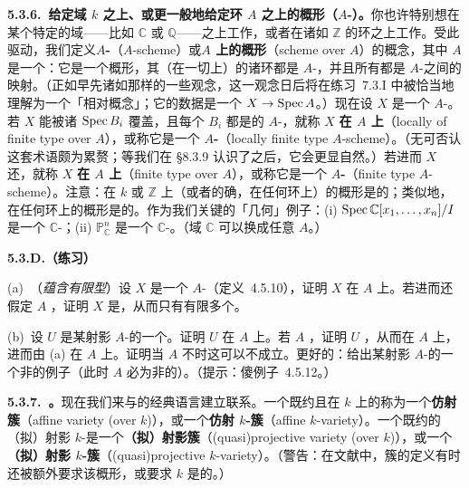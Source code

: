 \textbf{5.3.6.\ 给定域 $k$ 之上、或更一般地给定环 $A$ 之上的概形（$A$-\trScheme）。}\quad 你也许特别想在某个特定的域——比如 $\mathbb{C}$ 或 $\mathbb{Q}$——之上工作，或者在诸如 $\mathbb{Z}$ 的环之上工作。受此驱动，我们定义\textbf{$A$-\trScheme}（$A$-scheme）或\textbf{$A$ 上的概形}（scheme over $A$）的概念，其中 $A$ 是一个\trRing：它是一个概形，其\trStructureSheaf{}（在一切\trOpenSet{}上）的诸\trSection{}环都是 $A$-\trAlgebra，并且所有\trRestrictionMap{}都是 $A$-\trAlgebra{}之间的映射。（正如早先诸如\trQuasiseparatedness{}那样的一些观念，这一观念日后将在练习~7.3.I 中被恰当地理解为一个「相对概念」；它的数据是一个\trMorphism{} $X\to\operatorname{Spec} A$。）现在设 $X$ 是一个 $A$-\trScheme。若 $X$ 能被诸\trAffine\trOpenSet{} $\operatorname{Spec} B_i$ 覆盖，且每个 $B_i$ 都是\trFinitelyGenerated{}的 $A$-\trAlgebra，就称 $X$ \textbf{在 $A$ 上\trLocally\trFiniteType}（locally of finite type over $A$），或称它是一个\textbf{\trLocally\trFiniteType{} $A$-\trScheme}（locally finite type $A$-scheme）。（无可否认这套术语颇为累赘；等我们在 \S8.3.9 认识了\trMorphism{}之后，它会更显自然。）若进而 $X$ 还\trQuasicompact，就称 $X$ \textbf{在 $A$ 上\trFiniteType}（finite type over $A$），或称它是一个\textbf{\trFiniteType{} $A$-\trScheme}（finite type $A$-scheme）。注意：在 $k$ 或 $\mathbb{Z}$ 上（或者的确，在任何\trNoetherian{}环上）\trLocally\trFiniteType{}的概形是\trLocally\trNoetherian{}的；类似地，在任何\trNoetherian{}环上\trFiniteType{}的概形是\trNoetherian{}的。作为我们关键的「几何」例子：(i) $\operatorname{Spec}\mathbb{C}[x_1,\dots,x_n]/I$ 是一个\trFiniteType{} $\mathbb{C}$-\trScheme；(ii) $\mathbb{P}^n_{\mathbb{C}}$ 是一个\trFiniteType{} $\mathbb{C}$-\trScheme。（域 $\mathbb{C}$ 可以换成任意\trRing{} $A$。）

\textbf{5.3.D.（练习）}

(a)~（\emph{\trQuasiprojective{}蕴含有限型}）设 $X$ 是一个\trQuasiprojective{} $A$-\trScheme{}（定义~4.5.10），证明 $X$ 在 $A$ 上\trFiniteType。若进而还假定 $A$ \trNoetherian，证明 $X$ 是\trNoetherian{}\trScheme，从而只有有限多个\trIrreducibleComponent。

(b)~设 $U$ 是某射影 $A$-\trScheme{}的一个\trOpenSubscheme。证明 $U$ 在 $A$ 上\trLocally\trFiniteType。若 $A$ \trNoetherian，证明 $U$ \trQuasicompact，从而在 $A$ 上\trQuasiprojective{}，进而由 (a) 在 $A$ 上\trFiniteType。证明当 $A$ 不\trNoetherian{}时这可以不成立。更好的：给出某射影 $A$-\trScheme{}的一个非\trQuasicompact{}\trOpenSubscheme{}的例子（此时 $A$ 必为非\trNoetherian{}的）。（提示：傻例子~4.5.12。）

\textbf{5.3.7.\ \trVariety。}\quad 现在我们来与\trVariety{}的经典语言建立联系。一个既约且在 $k$ 上\trFiniteType{}的\trAffineScheme{}称为一个\textbf{仿射簇}（affine variety (over $k$)），或一个\textbf{仿射 $k$-簇}（affine $k$-variety）。一个既约的（拟）射影 $k$-\trScheme{}是一个\textbf{（拟）射影簇}（(quasi)projective variety (over $k$)），或一个\textbf{（拟）射影 $k$-簇}（(quasi)projective $k$-variety）。（警告：在文献中，簇的定义有时还被额外要求该概形\trIrreducible，或要求 $k$ 是\trAlgClosed{}的。）

